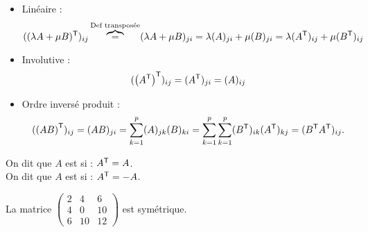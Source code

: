\documentclass{book}
\begin{document}
\begin{Demonstration}
\begin{itemize}
\item Linéaire : $$((\lambda A+ \mu B)^{\mathsf {T}})_{ij}\overbrace{=}^{\text{Def transposée}} (\lambda A+ \mu B)_{ji}=\lambda (A)_{ji}+\mu (B)_{ji}=\lambda (A^{\mathsf {T}})_{ij}+\mu (B^{\mathsf {T}})_{ij} $$
\item Involutive : $$(\left(A^{\mathsf {T}}\right)^{\mathsf {T}})_{ij}=(A^{\mathsf {T}})_{ji}=(A)_{ij}$$
\item Ordre inversé produit : $$(\left(AB \right)^{\mathsf {T}})_{ij}=(AB)_{ji}=\sum_{k=1}^p (A)_{jk}(B)_{ki}=\sum_{k=1}^p\sum_{k=1}^p (B^{\mathsf {T}})_{ik}  (A^{\mathsf {T}})_{kj}=( B^{\mathsf {T}}A^{\mathsf {T}})_{ij}.$$
\end{itemize}
\end{Demonstration}
\begin{Definition}
 On dit que $A$ est  si : $A^{\mathsf {T}} = A$.\\
 On dit que $A$ est  si : $A^{\mathsf {T}} = -A$.
\end{Definition}
\begin{Exemple}
La matrice $\begin{pmatrix}2&4&6\\4&0&10\\6&10&12\end{pmatrix}$ est  symétrique.
\end{Exemple}
\end{document}
